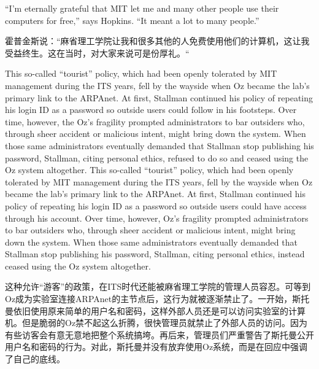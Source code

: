 \ifdefined\eng
``I'm eternally grateful that MIT let me and many other people use their computers for free,'' says Hopkins. ``It meant a lot to many people.''
\fi

\ifdefined\chs
霍普金斯说：``麻省理工学院让我和很多其他的人免费使用他们的计算机，这让我受益终生。这在当时，对大家来说可是份厚礼。``
\fi

\ifdefined\eng
\ifdefined\vone
This so-called ``tourist'' policy, which had been openly tolerated by MIT management during the ITS years, fell by the wayside when Oz became the lab's primary link to the ARPAnet. At first, Stallman continued his policy of repeating his login ID as a password so outside users could follow in his footsteps. Over time, however, the Oz's fragility prompted administrators to bar outsiders who, through sheer accident or malicious intent, might bring down the system. When those same administrators eventually demanded that Stallman stop publishing his password, Stallman, citing personal ethics, refused to do so and ceased using the Oz system altogether.
\fi
\ifdefined\vtwo
This so-called ``tourist'' policy, which had been openly tolerated by MIT management during the ITS years, fell by the wayside when Oz became the lab's primary link to the ARPAnet. At first, Stallman continued his policy of repeating his login ID as a password so outside users could have access through his account. Over time, however, Oz's fragility prompted administrators to bar outsiders who, through sheer accident or malicious intent, might bring down the system. When those same administrators eventually demanded that Stallman stop publishing his password, Stallman, citing personal ethics, instead ceased using the Oz system altogether.
\fi
\fi

\ifdefined\chs
这种允许``游客''的政策，在ITS时代还能被麻省理工学院的管理人员容忍。可等到Oz成为实验室连接ARPAnet的主节点后，这行为就被逐渐禁止了。一开始，斯托曼依旧使用原来简单的用户名和密码，这样外部人员还是可以访问实验室的计算机。但是脆弱的Oz禁不起这么折腾，很快管理员就禁止了外部人员的访问。因为有些访客会有意无意地把整个系统搞垮。再后来，管理员们严重警告了斯托曼公开用户名和密码的行为。对此，斯托曼并没有放弃使用Oz系统，而是在回应中强调了自己的底线。
\fi

